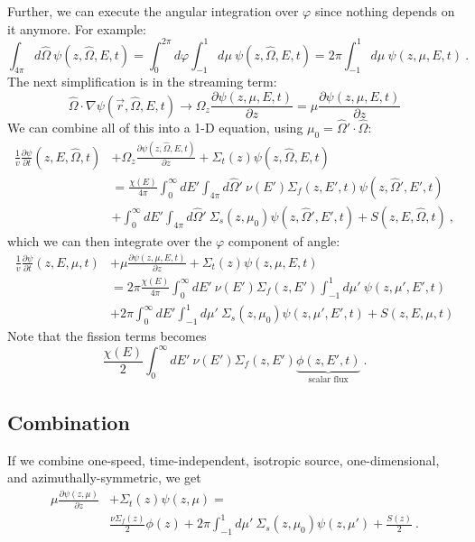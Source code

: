 \documentclass[12pt]{article}
\newcommand{\omvec}{\ensuremath{\hat{\Omega}}}
\newcommand{\vOmega}{\ensuremath{\hat{\Omega}}}
\begin{document}
Further, we can execute the angular integration over $\varphi$ since nothing depends on it anymore. For example:
\[
\int_{4 \pi} d\vOmega\: \psi(z, \vOmega, E, t) =   \int_0^{2\pi} d\varphi \int_{-1}^1 d\mu \:\psi(z, \vOmega, E, t) = 2 \pi \int_{-1}^1 d\mu \:\psi(z, \mu, E, t)\:.\]
%
The next simplification is in the streaming term:
\[\vOmega \cdot \nabla \psi(\vec{r}, \vOmega, E, t) \rightarrow \Omega_z \frac{\partial \psi(z, \mu, E, t)}{\partial z} = \mu \frac{\partial \psi(z, \mu, E, t)}{\partial z} \]
%
We can combine all of this into a 1-D equation, using $\mu_0 = \vOmega' \cdot \vOmega$:
\begin{align*}
\frac{1}{v}\frac{\partial \psi}{\partial t}(z,E,\omvec,t) &+ \Omega_z \frac{\partial \psi(z, \vOmega, E, t)}{\partial z} + \Sigma_t(z)\psi(z, \vOmega, E, t)  \\
&= \frac{\chi(E)}{4 \pi} \int_0^{\infty} dE'\int_{4 \pi} d\vOmega'\:  \nu(E')\Sigma_f(z,E',t)\psi(z, \vOmega', E', t)  \\
&+ \int_0^{\infty} dE' \int_{4 \pi} d\vOmega'\: \Sigma_s(z, \mu_0)\psi(z, \vOmega', E', t) + S(z, E, \vOmega, t)\:,
\end{align*}
%
which we can then integrate over the $\varphi$ component of angle:
\begin{align*}
\frac{1}{v}\frac{\partial \psi}{\partial t}(z,E,\mu,t) &+ \mu \frac{\partial \psi(z, \mu, E, t)}{\partial z} + \Sigma_t(z)\psi(z, \mu, E, t) \\
&= 2\pi\frac{\chi(E)}{4 \pi} \int_0^{\infty} dE' \: \nu(E')\Sigma_f(z,E') \int_{-1}^1 d\mu'\: \psi(z, \mu', E', t) \\
&+ 2\pi\int_0^{\infty} dE' \int_{-1}^1 d\mu'\: \Sigma_s(z, \mu_0)\psi(z, \mu', E', t)  + S(z, E, \mu, t)
\end{align*}
%
Note that the fission terms becomes
\[\frac{\chi(E)}{2} \int_0^{\infty} dE'\:  \nu(E')\Sigma_f(z,E')\underbrace{\phi(z, E', t)}_{\text{scalar flux}}\:. \]

\subsection*{Combination}
If we combine one-speed, time-independent, isotropic source, one-dimensional, and azimuthally-symmetric, we get
\begin{align*}
\mu \frac{\partial \psi(z, \mu)}{\partial z} &+ \Sigma_t(z)\psi(z, \mu) = \\
&\frac{\nu\Sigma_f(z) }{2}\phi(z) + 2\pi\int_{-1}^1 d\mu'\: \Sigma_s(z, \mu_0)\psi(z, \mu')  + \frac{S(z)}{2} \:.
\end{align*}
\end{document}
